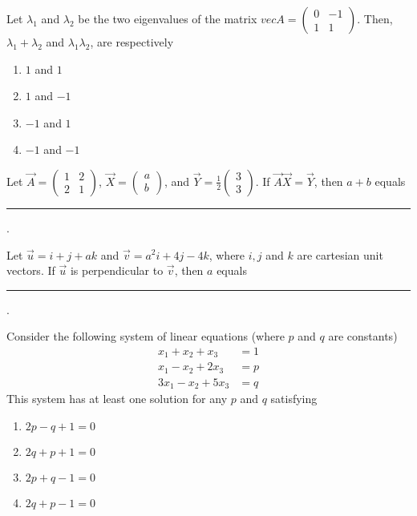 \item Let $\lambda_1$ and $\lambda_2$ be the two eigenvalues of the matrix $vec{A} = \begin{pmatrix} 0 & -1 \\ 1 & 1 \end{pmatrix}$. Then, $\lambda_1 + \lambda_2$ and $\lambda_1 \lambda_2$, are respectively
\hfill {}
\begin{multicols}{4}
\begin{enumerate}
    \item $1$ and $1$
    \item $1$ and $-1$
    \item $-1$ and $1$
    \item $-1$ and $-1$
\end{enumerate}
\end{multicols}
\item Let $\vec{A} = \begin{pmatrix} 1 & 2 \\ 2 & 1 \end{pmatrix}$, $\vec{X} = \begin{pmatrix} a \\ b \end{pmatrix} $, and $\vec{Y} = \frac{1}{2}\begin{pmatrix} 3 \\ 3 \end{pmatrix} $. If $\vec{A}\vec{X} = \vec{Y}$, then $a + b$ equals \rule{1cm}{0.15mm}.

\hfill {}
\item Let $\vec{u} = i + j + a k$ and $\vec{v} = a^2 i + 4j - 4k$, where $i, j$ and $k$ are cartesian unit vectors. If $\vec{u}$ is perpendicular to $\vec{v}$, then $a$ equals \rule{3cm}{0.15mm}.
\hfill {}
\item Consider the following system of linear equations (where $p$ and $q$ are constants)
\begin{align*}
x_1 + x_2 + x_3 & = 1 \\
x_1 - x_2 + 2x_3 & = p \\
3x_1 - x_2 + 5x_3 & = q
\end{align*}
This system has at least one solution for any $p$ and $q$ satisfying
\hfill {}
\begin{multicols}{4}
\begin{enumerate}
    \item $2p - q + 1 = 0$
    \item $2q + p + 1 = 0$
    \item $2p + q - 1 = 0$
    \item $2q + p - 1 = 0$
\end{enumerate}
\end{multicols}
